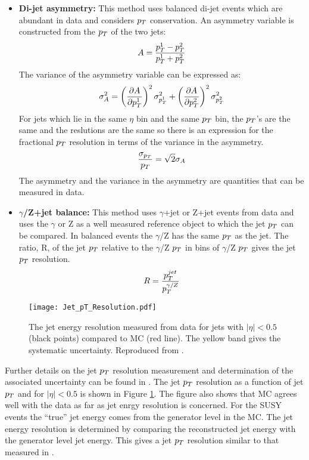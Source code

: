 \begin{itemize}
\item {\bf Di-jet asymmetry:} This method uses balanced di-jet events which are 
abundant in data and considers $p_{T}$ conservation. An asymmetry variable is 
constructed from the $p_{T}$ of the two jets:
\begin{equation}
A = \frac{p_{T}^{1} - p_{T}^{2}}{p_{T}^{1} + p_{T}^{2}}
\end{equation}
The variance of the asymmetry variable can be expressed as:
\begin{equation}
\sigma_{A}^{2} = \left(\frac{\partial A}{\partial
p_{T}^{1}}\right)^{2}\sigma_{p_{T}^{1}}^{2} + \left(\frac{\partial A}{\partial
p_{T}^{2}}\right)^{2}\sigma_{p_{T}^{2}}^{2}
\end{equation}
For jets which lie in the same $\eta$ bin and the same $p_{T}$ bin, the $p_{T}$'s
are the same and the reslutions are the same so there is an expression for the
fractional $p_{T}$ resolution in terms of the variance in the asymmetry.
\begin{equation}
\frac{\sigma_{p_{T}}}{p_{T}} = \sqrt{2}\sigma_{A}
\end{equation}  
The asymmetry and the variance in the asymmetry are quantities that can be 
measured in data.
\item {\bf $\gamma$/Z+jet balance:} This method uses $\gamma$+jet or Z+jet
events from data and uses the $\gamma$ or Z as a well measured reference object
to which the jet $p_{T}$ can be compared. In balanced events the $\gamma$/Z has 
the same $p_{T}$ as the jet. The ratio, R, of the jet $p_{T}$ relative to the 
$\gamma$/Z $p_{T}$ in bins of $\gamma$/Z $p_{T}$ gives the jet $p_{T}$ resolution. 
\begin{equation}
R = \frac{p_{T}^{jet}}{p_{T}^{\gamma/Z}}
\end{equation}
\end{itemize}

\begin{figure}
\begin{center}
\texttt{[image: Jet\_pT\_Resolution.pdf]}
\end{center}
\caption{The jet energy resolution measured from data for jets with $|\eta| <
0.5$ (black points) compared to MC (red line). The yellow band gives the
systematic uncertainty. Reproduced from \cite{jec}.}
\label{fig:Jet_pT_Resolution}
\end{figure}

Further details on the jet $p_{T}$ resolution measurement and determination of the
associated uncertainty can be found in \cite{jec}. The jet $p_{T}$ resolution as a
function of jet $p_{T}$ and for $|\eta| < 0.5$ is shown in Figure
\ref{fig:Jet_pT_Resolution}. The figure also shows that MC agrees well with the
data as far as jet enrgy resolution is concerned. For the SUSY events the 
``true'' jet energy comes from the generator level in the MC. The jet energy 
resolution is determined by comparing the reconstructed jet energy with the 
generator level jet energy. This gives a jet $p_{T}$ resolution similar to that 
measured in \cite{jec}. \\

